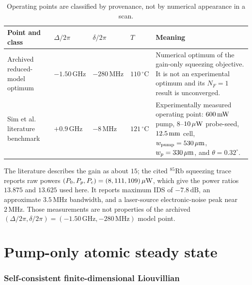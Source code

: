 \documentclass[11pt,a4paper]{article}
\newcommand{\GHz}{\,\mathrm{GHz}}
\newcommand{\MHz}{\,\mathrm{MHz}}
\newcommand{\dB}{\,\mathrm{dB}}
\newcommand{\degC}{\,^{\circ}\mathrm C}
\begin{document}
\begin{table}[ht]
\centering
\caption{Operating points are classified by provenance, not by numerical
appearance in a scan.}
\label{tab:operating-points}
\small
\begin{tabularx}{\textwidth}{L{3.2cm}C{2.0cm}C{2.0cm}C{1.7cm}Y}
\toprule
Point and class & $\Delta/2\pi$ & $\delta/2\pi$ & $T$ & Meaning\\
\midrule
Archived reduced-model optimum &
$-1.50\GHz$ & $-280\MHz$ & $110\degC$ &
Numerical optimum of the gain-only squeezing objective. It is not an
experimental optimum and its $N_F=1$ result is unconverged.\\
Sim et al. literature benchmark \cite{Sim2025} &
$+0.9\GHz$ & $-8\MHz$ & $121\degC$ &
Experimentally measured operating point: $600\,{\rm mW}$ pump,
$8$--$10\,\mu{\rm W}$ probe-seed, $12.5\,{\rm mm}$ cell,
$w_{\rm pump}=530\,\mu{\rm m}$, $w_p=330\,\mu{\rm m}$, and
$\theta=0.32^\circ$.\\
\bottomrule
\end{tabularx}
\end{table}

The literature describes the gain as about $15$; the cited $^{85}$Rb squeezing
trace reports raw powers $(P_0,P_p,P_c)=(8,111,109)\,\mu{\rm W}$, which give
the power ratios $13.875$ and $13.625$ used here.
It reports maximum IDS of $-7.8\dB$, an approximate $3.5\MHz$
bandwidth, and a laser-source electronic-noise peak near $2\MHz$. Those
measurements are not properties of the archived
$(\Delta/2\pi,\delta/2\pi)=(-1.50\GHz,-280\MHz)$ model point.

\part{Pump-only atomic steady state}

\section{Self-consistent finite-dimensional Liouvillian}
\end{document}
